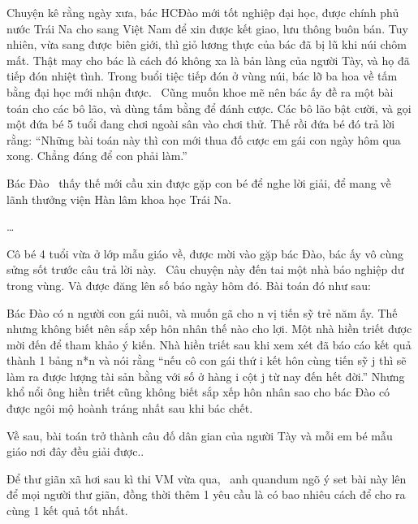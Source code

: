Chuyện kê rằng ngày xưa, bác HCĐào mới tốt nghiệp đại học, được chính phủ nước Trái Na cho sang Việt Nam để xin được kết giao, lưu thông buôn bán. Tuy nhiên, vừa sang được biên giới, thì giỏ lương thực của bác đã bị lũ khi núi chôm mất. Thật may cho bác là cách đó không xa là bản làng của người Tày, và họ đã tiếp đón nhiệt tình. Trong buổi tiệc tiếp đón ở vùng núi, bác lỡ ba hoa về tấm bằng đại học mới nhận được.  Cũng muốn khoe mẽ nên bác ấy đề ra một bài toán cho các bô lão, và dùng tấm bằng để đánh cược. Các bô lão bật cười, và gọi một đứa bé 5 tuổi đang chơi ngoài sân vào chơi thử. Thế rồi đứa bé đó trả lời rằng: “Những bài toán này thì con mới thua đố cược em gái con ngày hôm qua xong. Chẳng đáng để con phải làm.”  

   Bác Đào  thấy thế mới cầu xin được gặp con bé để nghe lời giải, để mang về lãnh thưởng viện Hàn lâm khoa học Trái Na.  

   …  

   Cô bé 4 tuổi vừa ở lớp mẫu giáo về, được mời vào gặp bác Đào, bác ấy vô cùng sửng sốt trước câu trả lời này.  Câu chuyện này đến tai một nhà báo nghiệp dư trong vùng. Và được đăng lên số báo ngày hôm đó. Bài toán đó như sau:  

   Bác Đào có n người con gái nuôi, và muốn gã cho n vị tiến sỹ trẻ năm ấy. Thế nhưng không biết nên sắp xếp hôn nhân thế nào cho lợi. Một nhà hiền triết được mời đến để tham khảo ý kiến. Nhà hiền triết sau khi xem xét đã báo cáo kết quả thành 1 bảng n*n và nói rằng “nếu cô con gái thứ i kết hôn cùng tiến sỹ j thì sẽ làm ra được lượng tài sản bằng với số ở hàng i cột j từ nay đến hết đời.” Nhưng khổ nổi ông hiền triết cũng không biết sắp xếp hôn nhân sao cho bác Đào có được ngôi mộ hoành tráng nhất sau khi bác chết.  



   Về sau, bài toán trở thành câu đố dân gian của người Tày và mỗi em bé mẫu giáo nơi đây đều giải được..  



   Để thư giãn xã hơi sau kì thi VM vừa qua,  anh quandum ngõ ý set bài này lên để mọi người thư giãn, đồng thời thêm 1 yêu cầu là có bao nhiêu cách để cho ra cùng 1 kết quả tốt nhất.  

\